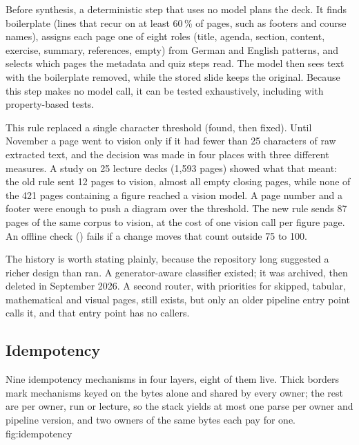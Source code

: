 Before synthesis, a deterministic step that uses no model plans the deck. It
finds boilerplate (lines that recur on at least 60\,\% of pages, such as footers
and course names), assigns each page one of eight roles (title, agenda,
section, content, exercise, summary, references, empty) from German and English
patterns, and selects which pages the metadata and quiz steps read. The model
then sees text with the boilerplate removed, while the stored slide keeps the
original. Because this step makes no model call, it can be tested exhaustively,
including with property-based tests.

This rule replaced a single character threshold (found, then fixed). Until
November a page went to vision only if it had fewer than 25 characters of raw
extracted text, and the decision was made in four places with three different
measures. A study on 25 lecture decks (1{,}593 pages) showed what that meant: the
old rule sent 12 pages to vision, almost all empty closing pages, while none of
the 421 pages containing a figure reached a vision model. A page number and a
footer were enough to push a diagram over the threshold. The new rule sends 87
pages of the same corpus to vision, at the cost of one vision call per figure
page. An offline check () fails if a change
moves that count outside 75 to 100.

The history is worth stating plainly, because the repository long suggested a
richer design than ran. A generator-aware classifier existed; it was archived,
then deleted in September 2026. A second router, with priorities for skipped,
tabular, mathematical and visual pages, still exists, but only an older pipeline
entry point calls it, and that entry point has no callers.

\subsection{Idempotency}
\label{sec:idempotency}

  {Nine idempotency mechanisms in four layers, eight of them live. Thick borders
   mark mechanisms keyed on the bytes alone and shared by every owner; the rest
   are per owner, run or lecture, so the stack yields at most one parse per
   owner and pipeline version, and two owners of the same bytes each pay for
   one.}
  {fig:idempotency}

